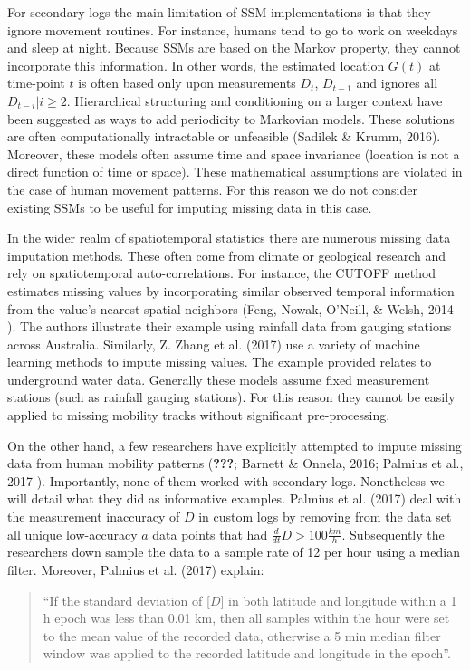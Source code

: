 \documentclass[man]{apa6}
\theoremstyle{definition}
\theoremstyle{definition}
\theoremstyle{definition}
\theoremstyle{remark}
\begin{document}
For secondary logs the main limitation of SSM implementations is that
they ignore movement routines. For instance, humans tend to go to work
on weekdays and sleep at night. Because SSMs are based on the Markov
property, they cannot incorporate this information. In other words, the
estimated location \(G(t)\) at time-point \(t\) is often based only upon
measurements \(D_t\), \(D_{t-1}\) and ignores all \(D_{t-i}|i\geq2\).
Hierarchical structuring and conditioning on a larger context have been
suggested as ways to add periodicity to Markovian models. These
solutions are often computationally intractable or unfeasible (Sadilek
\& Krumm, 2016). Moreover, these models often assume time and space
invariance (location is not a direct function of time or space). These
mathematical assumptions are violated in the case of human movement
patterns. For this reason we do not consider existing SSMs to be useful
for imputing missing data in this case.

In the wider realm of spatiotemporal statistics there are numerous
missing data imputation methods. These often come from climate or
geological research and rely on spatiotemporal auto-correlations. For
instance, the CUTOFF method estimates missing values by incorporating
similar observed temporal information from the value's nearest spatial
neighbors (Feng, Nowak, O'Neill, \& Welsh, 2014 ). The authors
illustrate their example using rainfall data from gauging stations
across Australia. Similarly, Z. Zhang et al. (2017) use a variety of
machine learning methods to impute missing values. The example provided
relates to underground water data. Generally these models assume fixed
measurement stations (such as rainfall gauging stations). For this
reason they cannot be easily applied to missing mobility tracks without
significant pre-processing.

On the other hand, a few researchers have explicitly attempted to impute
missing data from human mobility patterns ({\textbf{???}}; Barnett \&
Onnela, 2016; Palmius et al., 2017 ). Importantly, none of them worked
with secondary logs. Nonetheless we will detail what they did as
informative examples. Palmius et al. (2017) deal with the measurement
inaccuracy of \(D\) in custom logs by removing from the data set all
unique low-accuracy \(a\) data points that had
\(\frac{d}{dt}D > 100 \frac{km}{h}\). Subsequently the researchers down
sample the data to a sample rate of 12 per hour using a median filter.
Moreover, Palmius et al. (2017) explain:

\begin{quote}
\enquote{If the standard deviation of {[}\(D\){]} in both latitude and
longitude within a 1 h epoch was less than 0.01 km, then all samples
within the hour were set to the mean value of the recorded data,
otherwise a 5 min median filter window was applied to the recorded
latitude and longitude in the epoch}.
\end{quote}
\end{document}
